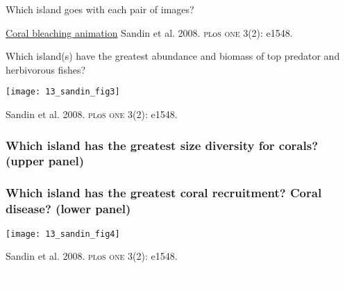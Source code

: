 \documentclass[t]{beamer}
\begin{document}
{
\begin{frame}[b]{Which island goes with each pair of images?}


	\tiny {}\href{http://coralreefwatch.noaa.gov/satellite/baa.php}{Coral bleaching animation} \hfill \onslide<1->\tiny Sandin et al. 2008. \textsc{pl}o\textsc{s one} 3(2): e1548.

\end{frame}
}
%
\begin{frame}[t]{Which island(s) have the greatest abundance and biomass of top predator and herbivorous fishes?}

	\texttt{[image: 13\_sandin\_fig3]}

	\vfilll
	
	\hfill \tiny Sandin et al. 2008. \textsc{pl}o\textsc{s one} 3(2): e1548.

\end{frame}
%
\begin{frame}[t]
	\frametitle<1>{Which island has the greatest size diversity for corals? (upper panel)}
	\frametitle<2>{Which island has the greatest coral recruitment? Coral disease? (lower panel)}

	\centering \texttt{[image: 13\_sandin\_fig4]}

	\vfilll
	
	\hfill \tiny Sandin et al. 2008. \textsc{pl}o\textsc{s one} 3(2): e1548.

\end{frame}
%


{
\begin{frame}[b]

	\hfill \tiny \textcolor{white}{Wishart 2009. Significance, March.}

\end{frame}
}
\end{document}
